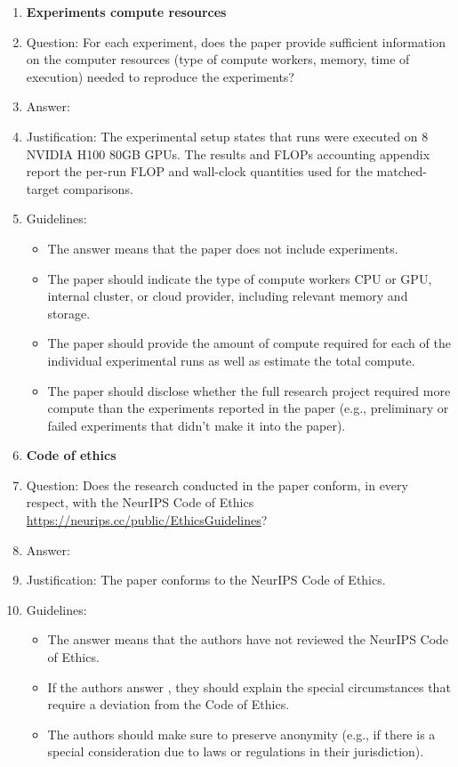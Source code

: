 \documentclass{article}
\begin{document}
\begin{enumerate}
\item {\bf Experiments compute resources}
    \item[] Question: For each experiment, does the paper provide sufficient information on the computer resources (type of compute workers, memory, time of execution) needed to reproduce the experiments?
    \item[] Answer: \answerYes{} %
    \item[] Justification: The experimental setup states that runs were executed on 8 NVIDIA H100 80GB GPUs. The results and FLOPs accounting appendix report the per-run FLOP and wall-clock quantities used for the matched-target comparisons.
    \item[] Guidelines:
    \begin{itemize}
        \item The answer \answerNA{} means that the paper does not include experiments.
        \item The paper should indicate the type of compute workers CPU or GPU, internal cluster, or cloud provider, including relevant memory and storage.
        \item The paper should provide the amount of compute required for each of the individual experimental runs as well as estimate the total compute. 
        \item The paper should disclose whether the full research project required more compute than the experiments reported in the paper (e.g., preliminary or failed experiments that didn't make it into the paper). 
    \end{itemize}
    
\item {\bf Code of ethics}
    \item[] Question: Does the research conducted in the paper conform, in every respect, with the NeurIPS Code of Ethics \url{https://neurips.cc/public/EthicsGuidelines}?
    \item[] Answer: \answerYes{} %
    \item[] Justification: The paper conforms to the NeurIPS Code of Ethics.
    \item[] Guidelines:
    \begin{itemize}
        \item The answer \answerNA{} means that the authors have not reviewed the NeurIPS Code of Ethics.
        \item If the authors answer \answerNo, they should explain the special circumstances that require a deviation from the Code of Ethics.
        \item The authors should make sure to preserve anonymity (e.g., if there is a special consideration due to laws or regulations in their jurisdiction).
    \end{itemize}



\end{enumerate}
\end{document}
